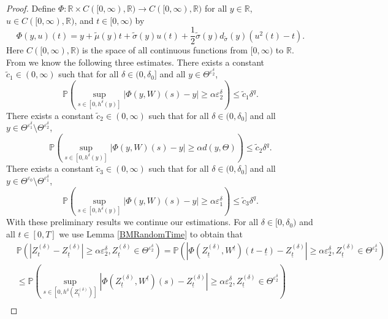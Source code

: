\documentclass[11pt,a4paper]{article}
\numberwithin{equation}{section}
\theoremstyle{definition}
\renewcommand{\P}{{\mathbb{P}}}
\newcommand{\R}{{\mathbb{R}}}
\begin{document}
\begin{proof}
    Define $\Phi\colon \R\times C([0,\infty),\R) \to C([0,\infty),\R)$ for all $y\in\R$, $u\in C([0,\infty),\R)$, and $t\in[0,\infty)$ by
    \begin{equation}
        \Phi(y,u)(t) = y+\widetilde \mu(y) t + \widetilde \sigma(y) u(t) + \frac{1}{2} \widetilde \sigma(y) d_{\widetilde \sigma}(y) (u^2(t)-t).
    \end{equation}
    Here $C([0,\infty),\R)$ is the space of all continuous functions from $[0,\infty)$ to $\R$.
    From \cite[Proof of Lemma 7]{Yaroslavtseva2022} we know the following three estimates. There exists a constant $\widetilde c_1\in(0,\infty)$ such that for all $\delta\in(0,\delta_0]$ and all $y\in\Theta^{\varepsilon_2^\delta}$,
    \begin{equation}
        \P(\sup_{s\in[0,h^\delta(y)]} |\Phi(y,W)(s) -y | \geq \alpha\varepsilon_2^\delta)\leq \widetilde c_1 \delta^q.
    \end{equation}
    There exists a constant $\widetilde c_2\in(0,\infty)$ such that for all $\delta\in(0,\delta_0]$ and all $y\in\Theta^{\varepsilon_1^\delta}\setminus \Theta^{\varepsilon_2^\delta}$,
    \begin{equation}
        \P(\sup_{s\in[0,h^\delta(y)]} |\Phi(y,W)(s) -y | \geq \alpha d(y,\Theta)) \leq \widetilde c_2 \delta^q.
    \end{equation}
    There exists a constant $\widetilde c_3\in(0,\infty)$ such that for all $\delta\in(0,\delta_0]$ and all $y\in\Theta^{\varepsilon_0}\setminus \Theta^{\varepsilon_1^\delta}$,
    \begin{equation}
        \P(\sup_{s\in[0,h^\delta(y)]} |\Phi(y,W)(s) -y | \geq \alpha\varepsilon_1^\delta)\leq \widetilde c_3 \delta^q.
    \end{equation}
    With these preliminary results we continue our estimations. For all $\delta\in[0,\delta_0)$ and all $t\in[0,T]$ we use Lemma \ref{BMRandomTime} to obtain that
    \begin{equation}
        \begin{aligned}
            &\P(|Z^{(\delta)}_{t} -Z^{(\delta)}_{\underline{t}} | \geq \alpha \varepsilon_2^\delta, Z^{(\delta)}_{\underline{t}} \in \Theta^{\varepsilon_2^\delta})
            = \P(| \Phi(Z^{(\delta)}_{\underline{t}},W^{\underline{t}})(t-\underline{t}) - Z^{(\delta)}_{\underline{t}}| \geq \alpha \varepsilon_2^\delta, Z^{(\delta)}_{\underline{t}} \in \Theta^{\varepsilon_2^\delta})\\
            &\leq \P(\sup_{s\in[0,h^{\delta}(Z^{(\delta)}_{\underline{t}})]} | \Phi(Z^{(\delta)}_{\underline{t}},W^{\underline{t}})(s) - Z^{(\delta)}_{\underline{t}}| \geq \alpha \varepsilon_2^\delta, Z^{(\delta)}_{\underline{t}} \in \Theta^{\varepsilon_2^\delta})\\

\end{aligned}
\end{equation}
\end{proof}
\end{document}
